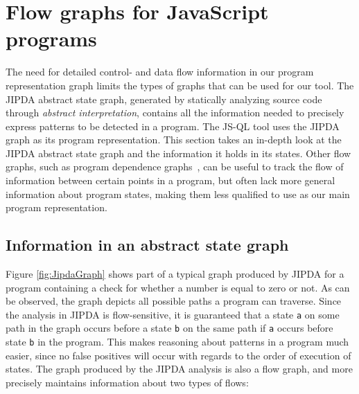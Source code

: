 \section{Flow graphs for JavaScript programs}
\label{sec:FlowGraphs}
The need for detailed control- and data flow information in our program representation graph limits the types of graphs that can be used for our tool. The JIPDA abstract state graph, generated by statically analyzing source code through \textit{abstract interpretation}, contains all the information needed to precisely express patterns to be detected in a program. The JS-QL tool uses the JIPDA graph as its program representation. This section takes an in-depth look at the JIPDA abstract state graph and the information it holds in its states. Other flow graphs, such as program dependence graphs~\cite{PDG}, can be useful to track the flow of information between certain points in a program, but often lack more general information about program states, making them less qualified to use as our main program representation.

\subsection{Information in an abstract state graph}

Figure \ref{fig:JipdaGraph} shows part of a typical graph produced by JIPDA for a program containing a check for whether a number is equal to zero or not. As can be observed, the graph depicts all possible paths a program can traverse. Since the analysis in JIPDA is flow-sensitive, it is guaranteed that a state \texttt{a} on some path in the graph occurs before a state \texttt{b} on the same path if \texttt{a} occurs before state \texttt{b} in the program. This makes reasoning about patterns in a program much easier, since no false positives will occur with regards to the order of execution of states. The graph produced by the JIPDA analysis is also a flow graph, and more precisely maintains information about two types of flows:


